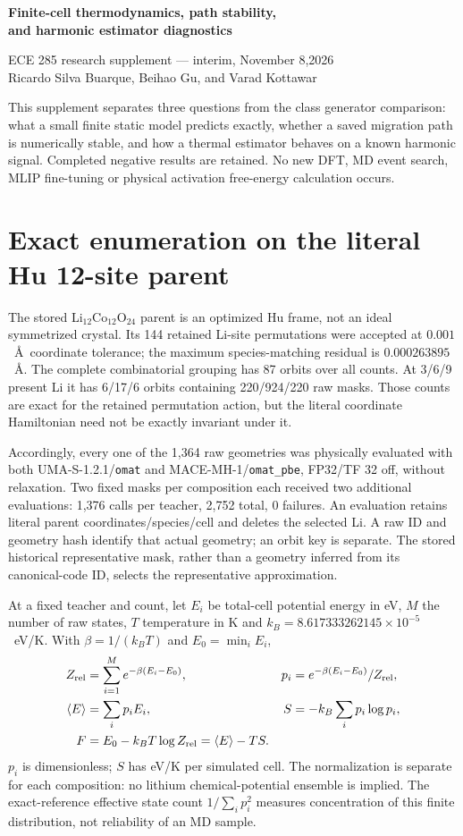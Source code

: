 \documentclass[10pt]{article}
\begin{document}
\begin{center}{\Large\bfseries Finite-cell thermodynamics, path stability,\\and harmonic estimator diagnostics}\par\vspace{5 pt}
ECE 285 research supplement --- interim, November 8,2026\\
Ricardo Silva Buarque, Beihao Gu, and Varad Kottawar
\end{center}
This supplement separates three questions from the class generator comparison:
what a small finite static model predicts exactly, whether a saved migration
path is numerically stable, and how a thermal estimator behaves on a known
harmonic signal. Completed negative results are retained. No new DFT, MD event
search, MLIP fine-tuning or physical activation free-energy calculation occurs.

\section{Exact enumeration on the literal Hu 12-site parent}
The stored Li$_{12}$Co$_{12}$O$_{24}$ parent is an optimized Hu frame, not an ideal
symmetrized crystal. Its 144 retained Li-site permutations were accepted at
$0.001$~\AA\ coordinate tolerance; the maximum species-matching residual is
$0.000263895$~\AA. The complete combinatorial grouping has 87 orbits over all
counts. At 3/6/9 present Li it has 6/17/6 orbits containing 220/924/220 raw masks.
Those counts are exact for the retained permutation action, but the literal
coordinate Hamiltonian need not be exactly invariant under it.

Accordingly, every one of the 1,364 raw geometries was physically evaluated with
both UMA-S-1.2.1/\texttt{omat} and MACE-MH-1/\texttt{omat\_pbe}, FP32/TF 32 off,
without relaxation. Two fixed masks per composition each received two additional
evaluations: 1,376 calls per teacher, 2,752 total, 0 failures. An evaluation retains
literal parent coordinates/species/cell and deletes the selected Li. A raw ID
and geometry hash identify that actual geometry; an orbit key is separate.
The stored historical representative mask, rather than a geometry inferred from
its canonical-code ID, selects the representative approximation.

At a fixed teacher and count, let $E_i$ be total-cell potential energy in eV,
$M$ the number of raw states, $T$ temperature in K and
$k_B=8.617333262145\times 10^{-5}$~eV/K. With
$\beta=1/(k_BT)$ and $E_0=\min_iE_i$,
\begin{align}
Z_{\rm rel}&=\sum_{i=1}^M e^{-\beta(E_i-E_0)},&
p_i&=e^{-\beta(E_i-E_0)}/Z_{\rm rel},\\
\langle E\rangle&=\sum_i p_iE_i,&
S&=-k_B\sum_i p_i\log p_i,\\
F&=E_0-k_BT\log Z_{\rm rel}=\langle E\rangle-TS.
\end{align}
$p_i$ is dimensionless; $S$ has eV/K per simulated cell. The normalization is
separate for each composition: no lithium chemical-potential ensemble is implied.
The exact-reference effective state count $1/\sum_i p_i^2$ measures concentration
of this finite distribution, not reliability of an MD sample.
\end{document}
